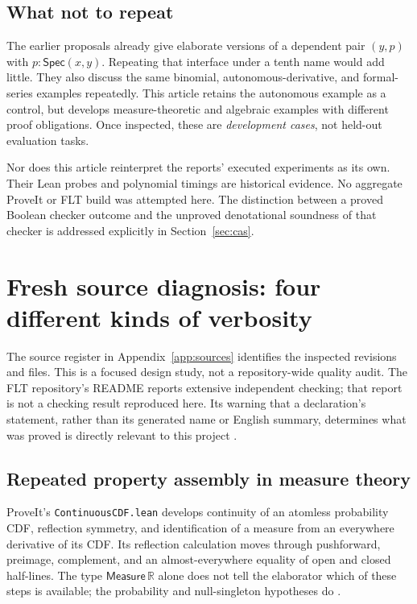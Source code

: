 \documentclass[11pt,a4paper]{article}
\newcommand{\code}[1]{\nolinkurl{#1}}
\newcommand{\R}{\mathbb R}\newcommand{\Q}{\mathbb Q}
\newcommand{\Spec}{\mathsf{Spec}}
\theoremstyle{plain}
\theoremstyle{definition}
\theoremstyle{remark}
\begin{document}
\subsection{What not to repeat}
The earlier proposals already give elaborate versions of a dependent pair
$(y,p)$ with $p:\Spec(x,y)$. Repeating that interface under a tenth name would
add little. They also discuss the same binomial, autonomous-derivative, and
formal-series examples repeatedly. This article retains the autonomous example
as a control, but develops measure-theoretic and algebraic examples with
different proof obligations. Once inspected, these are \emph{development cases},
not held-out evaluation tasks.

Nor does this article reinterpret the reports' executed experiments as its own.
Their Lean probes and polynomial timings are historical evidence. No aggregate
ProveIt or FLT build was attempted here. The distinction between a proved
Boolean checker outcome and the unproved denotational soundness of that checker
is addressed explicitly in Section~\ref{sec:cas}.

\section{Fresh source diagnosis: four different kinds of verbosity}
\label{sec:diagnosis}
The source register in Appendix~\ref{app:sources} identifies the inspected
revisions and files. This is a focused design study, not a repository-wide
quality audit. The FLT repository's README reports extensive independent
checking; that report is not a checking result reproduced here. Its warning
that a declaration's statement, rather than its generated name or English
summary, determines what was proved is directly relevant to this project
\cite{fltreadme}.

\subsection{Repeated property assembly in measure theory}
ProveIt's \code{ContinuousCDF.lean} develops continuity of an atomless
probability CDF, reflection symmetry, and identification of a measure from an
everywhere derivative of its CDF. Its reflection calculation moves through
pushforward, preimage, complement, and an almost-everywhere equality of open
and closed half-lines. The type $\mathsf{Measure}\,\R$ alone does not tell the
elaborator which of these steps is available; the probability and
null-singleton hypotheses do \cite{cdfsource}.
\end{document}
